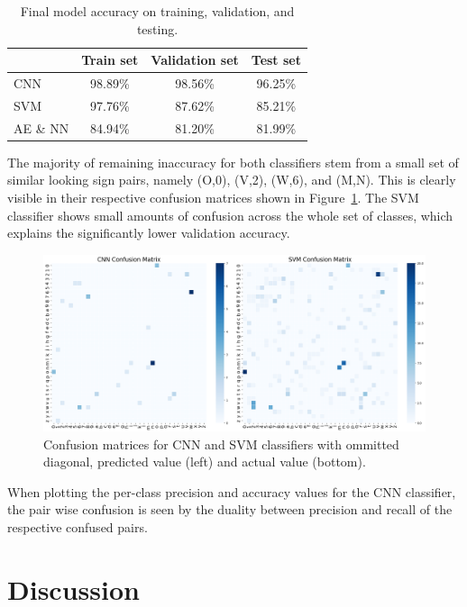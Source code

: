 \documentclass[a4, 10 pt, conference]{ieeeconf}  %
\begin{document}
\begin{table}[H]
  \centering
  \begin{tabular}{|l|c|c|c|}
    \hline
             & Train set & Validation set & Test set \\
    \hline
    CNN      & 98.89\%   & 98.56\%        & 96.25\%  \\
    SVM      & 97.76\%   & 87.62\%        & 85.21\%  \\
    AE \& NN & 84.94\%   & 81.20\%        & 81.99\%  \\
    \hline
  \end{tabular}
  \caption{Final model accuracy on training, validation, and testing.}
  \label{tab:classifier_accuracy}
\end{table}

\vspace{-1.5em}

The majority of remaining inaccuracy for both classifiers stem from a small set of similar
looking sign pairs, namely (O,0), (V,2), (W,6), and (M,N). This is clearly visible
in their respective confusion matrices shown in Figure~\ref{fig:cm}. The SVM
classifier shows small amounts of confusion across the whole set of classes,
which explains the significantly lower validation accuracy.

\begin{figure}[htb]
  \centering
  \includegraphics[width=\linewidth]{../images/cm_comparison.png}
  \caption{Confusion matrices for CNN and SVM classifiers with ommitted diagonal, predicted value (left) and actual value (bottom).}
  \label{fig:cm}
\end{figure}

When plotting the per-class precision and accuracy values for the CNN classifier,
the pair wise confusion is seen by the duality between precision and recall of the
respective confused pairs.

\section{Discussion}
\label{sec:discuss}
\end{document}
